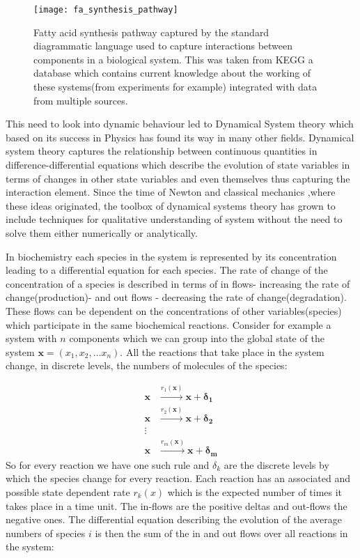 \begin{figure}[htbp!] 
\centering    
\texttt{[image: fa\_synthesis\_pathway]}
\caption[Fatty Acid synthesis pathway]{Fatty acid synthesis pathway
  captured by the standard diagrammatic language used to capture
  interactions between components in a biological system. This was
  taken from KEGG a database which contains current knowledge about
  the working of these systems(from experiments for example)
  integrated with data from multiple sources.}
\label{fig:fa_synthesis_pathway}
\end{figure}

This need to look into dynamic behaviour led to Dynamical System
theory which based on its success in Physics has found its way in many
other fields. Dynamical system theory captures the relationship
between continuous quantities in difference-differential equations
which describe the evolution of state variables in terms of changes
in other state variables and even themselves thus capturing the
interaction element. Since the time of Newton and classical mechanics
,where these ideas originated, the toolbox of dynamical systems theory
has grown to include techniques for qualitative understanding of
system without the need to solve them either numerically or
analytically. 

In biochemistry each species in the system is represented by its 
concentration leading to a differential equation for each species. The
rate of change of the concentration of a species is described in terms
of in flows- increasing the rate of change(production)- and out flows
- decreasing the rate of change(degradation). These flows can be
dependent on the concentrations of other variables(species) which
participate in the same biochemical reactions. Consider for example a
system with $n$ components which we can group into the global state of
the system $\mathbf{x} = (x_1, x_2, \dots x_n)$. All the reactions
that take place in the system change, in discrete levels, the numbers
of molecules of the species:

\begin{align*}
\mathbf{x} &\overset{r_1(\mathbf{x})}{\longrightarrow} \mathbf{x} +
\mathbf{\delta_1}\\
\mathbf{x} &\overset{r_2(\mathbf{x})}{\longrightarrow} \mathbf{x} +
\mathbf{\delta_2}\\
\vdots \\
\mathbf{x} &\overset{r_m(\mathbf{x})}{\longrightarrow} \mathbf{x} +
\mathbf{\delta_m}
\end{align*}
So for every reaction we have one such rule and $\delta_k$ are the
discrete levels by which the species change for every reaction. Each
reaction has an associated and possible state dependent rate $r_k(x)$
which is the expected number of times it takes place in a time
unit. The in-flows are the positive deltas and out-flows the negative
ones. The differential equation describing the evolution of the average numbers
of  species $i$ is then the sum of the in
and out flows over all reactions in the system:

